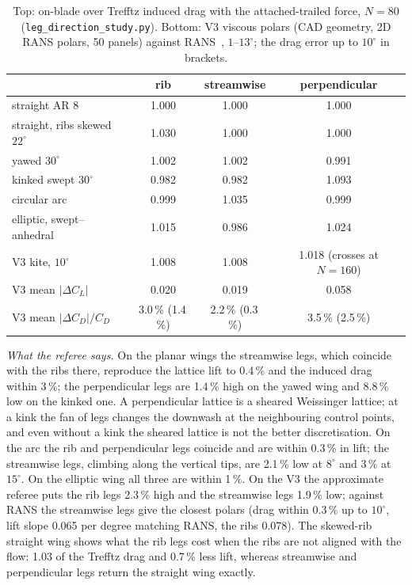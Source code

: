 \documentclass[11pt,a4paper]{article}
\begin{document}
\begin{table}[h]\centering\small
\caption{Top: on-blade over Trefftz induced drag with the attached-trailed force, $N=80$ (\texttt{leg\_direction\_study.py}). Bottom: V3 viscous polars (CAD geometry, 2D RANS polars, 50 panels) against RANS~\cite{poland2026}, $1$--$13^\circ$; the drag error up to $10^\circ$ in brackets.}
\label{tab:legs3}
\begin{tabular}{lccc}
\toprule
 & rib & streamwise & perpendicular\\
\midrule
straight AR 8 & 1.000 & 1.000 & 1.000\\
straight, ribs skewed $22^\circ$ & 1.030 & 1.000 & 1.000\\
yawed $30^\circ$ & 1.002 & 1.002 & 0.991\\
kinked swept $30^\circ$ & 0.982 & 0.982 & 1.093\\
circular arc & 0.999 & 1.035 & 0.999\\
elliptic, swept--anhedral & 1.015 & 0.986 & 1.024\\
V3 kite, $10^\circ$ & 1.008 & 1.008 & 1.018 (crosses at $N=160$)\\
\midrule
V3 mean $|\Delta C_L|$ & 0.020 & 0.019 & 0.058\\
V3 mean $|\Delta C_D|/C_D$ & 3.0\,\% (1.4\,\%) & 2.2\,\% (0.3\,\%) & 3.5\,\% (2.5\,\%)\\
\bottomrule
\end{tabular}
\end{table}

\emph{What the referee says.} On the planar wings the streamwise legs, which coincide with the ribs there, reproduce the lattice lift to 0.4\,\% and the induced drag within 3\,\%; the perpendicular legs are 1.4\,\% high on the yawed wing and 8.8\,\% low on the kinked one. A perpendicular lattice is a sheared Weissinger lattice; at a kink the fan of legs changes the downwash at the neighbouring control points, and even without a kink the sheared lattice is not the better discretisation. On the arc the rib and perpendicular legs coincide and are within 0.3\,\% in lift; the streamwise legs, climbing along the vertical tips, are 2.1\,\% low at $8^\circ$ and 3\,\% at $15^\circ$. On the elliptic wing all three are within 1\,\%. On the V3 the approximate referee puts the rib legs 2.3\,\% high and the streamwise legs 1.9\,\% low; against RANS the streamwise legs give the closest polars (drag within 0.3\,\% up to $10^\circ$, lift slope 0.065 per degree matching RANS, the ribs 0.078). The skewed-rib straight wing shows what the rib legs cost when the ribs are not aligned with the flow: 1.03 of the Trefftz drag and 0.7\,\% less lift, whereas streamwise and perpendicular legs return the straight wing exactly.
\end{document}
